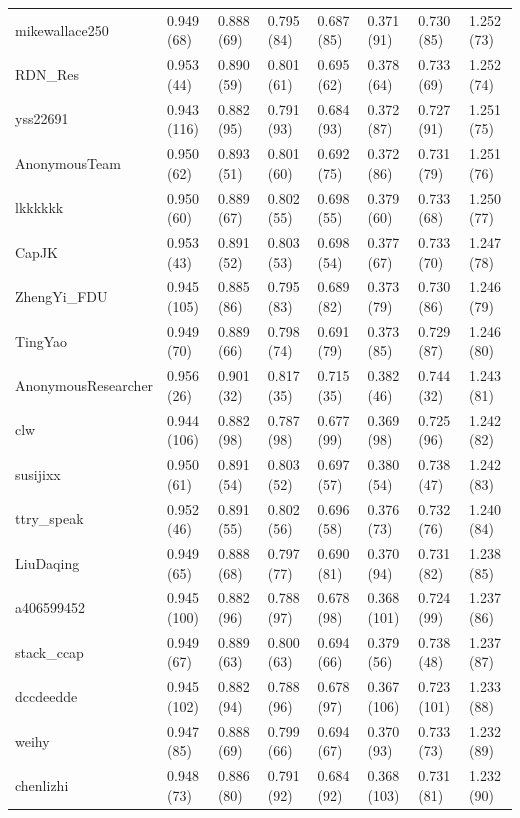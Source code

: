 \documentclass[english,twoside,openright]{HYgraduMLDS}
\begin{document}
\begin{appendices}
\begin{longtable}{l|l|l|l|l|l|l|l}
mikewallace250 & 0.949 (68) & 0.888 (69) & 0.795 (84) & 0.687 (85) & 0.371 (91) & 0.730 (85) & 1.252 (73) \\
RDN\_Res & 0.953 (44) & 0.890 (59) & 0.801 (61) & 0.695 (62) & 0.378 (64) & 0.733 (69) & 1.252 (74) \\
yss22691 & 0.943 (116) & 0.882 (95) & 0.791 (93) & 0.684 (93) & 0.372 (87) & 0.727 (91) & 1.251 (75) \\
AnonymousTeam & 0.950 (62) & 0.893 (51) & 0.801 (60) & 0.692 (75) & 0.372 (86) & 0.731 (79) & 1.251 (76) \\
lkkkkkk & 0.950 (60) & 0.889 (67) & 0.802 (55) & 0.698 (55) & 0.379 (60) & 0.733 (68) & 1.250 (77) \\
CapJK & 0.953 (43) & 0.891 (52) & 0.803 (53) & 0.698 (54) & 0.377 (67) & 0.733 (70) & 1.247 (78) \\
ZhengYi\_FDU & 0.945 (105) & 0.885 (86) & 0.795 (83) & 0.689 (82) & 0.373 (79) & 0.730 (86) & 1.246 (79) \\
TingYao & 0.949 (70) & 0.889 (66) & 0.798 (74) & 0.691 (79) & 0.373 (85) & 0.729 (87) & 1.246 (80) \\
AnonymousResearcher & 0.956 (26) & 0.901 (32) & 0.817 (35) & 0.715 (35) & 0.382 (46) & 0.744 (32) & 1.243 (81) \\
clw & 0.944 (106) & 0.882 (98) & 0.787 (98) & 0.677 (99) & 0.369 (98) & 0.725 (96) & 1.242 (82) \\
susijixx & 0.950 (61) & 0.891 (54) & 0.803 (52) & 0.697 (57) & 0.380 (54) & 0.738 (47) & 1.242 (83) \\
ttry\_speak & 0.952 (46) & 0.891 (55) & 0.802 (56) & 0.696 (58) & 0.376 (73) & 0.732 (76) & 1.240 (84) \\
LiuDaqing & 0.949 (65) & 0.888 (68) & 0.797 (77) & 0.690 (81) & 0.370 (94) & 0.731 (82) & 1.238 (85) \\
a406599452 & 0.945 (100) & 0.882 (96) & 0.788 (97) & 0.678 (98) & 0.368 (101) & 0.724 (99) & 1.237 (86) \\
stack\_ccap & 0.949 (67) & 0.889 (63) & 0.800 (63) & 0.694 (66) & 0.379 (56) & 0.738 (48) & 1.237 (87) \\
dccdeedde & 0.945 (102) & 0.882 (94) & 0.788 (96) & 0.678 (97) & 0.367 (106) & 0.723 (101) & 1.233 (88) \\
weihy & 0.947 (85) & 0.888 (69) & 0.799 (66) & 0.694 (67) & 0.370 (93) & 0.733 (73) & 1.232 (89) \\
chenlizhi & 0.948 (73) & 0.886 (80) & 0.791 (92) & 0.684 (92) & 0.368 (103) & 0.731 (81) & 1.232 (90) \\

\end{longtable}
\end{appendices}
\end{document}
